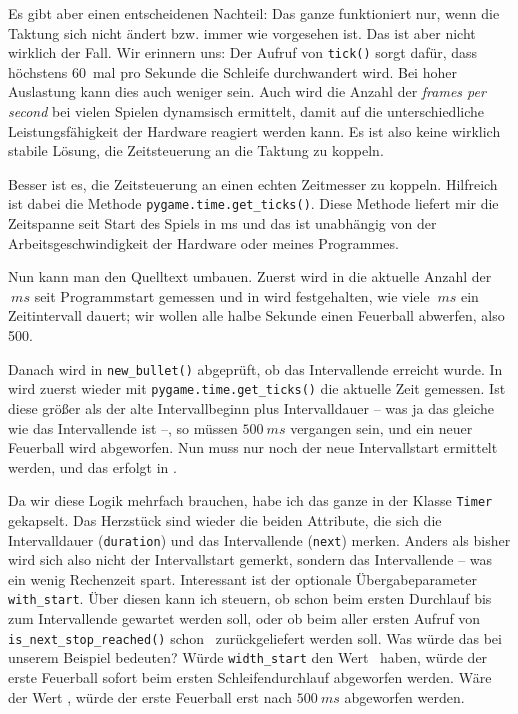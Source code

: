 Es gibt aber einen entscheidenen Nachteil: Das ganze funktioniert nur, wenn die Taktung sich nicht ändert bzw. immer wie vorgesehen ist. Das ist aber nicht wirklich der Fall. Wir erinnern uns: Der Aufruf von \texttt{tick()} sorgt dafür, dass höchstens 60~mal pro Sekunde die Schleife durchwandert wird. Bei hoher Auslastung kann dies auch weniger sein. Auch wird die Anzahl der \emph{frames per second} bei vielen Spielen dynamsisch ermittelt, damit auf die unterschiedliche Leistungsfähigkeit der Hardware reagiert werden kann. Es ist also keine wirklich stabile Lösung, die Zeitsteuerung an die Taktung zu koppeln. 

Besser ist es, die Zeitsteuerung an einen echten Zeitmesser zu koppeln. Hilfreich ist dabei die Methode \texttt{pygame.time.get\_ticks()}. Diese Methode liefert mir die Zeitspanne seit Start des Spiels in \gls{ms} und das ist unabhängig von der Arbeitsgeschwindigkeit der Hardware oder meines Programmes.

Nun kann man den Quelltext umbauen. Zuerst wird in  die aktuelle Anzahl der $~ms$ seit Programmstart gemessen und in  wird festgehalten, wie viele $~ms$ ein Zeitintervall dauert; wir wollen alle halbe Sekunde einen Feuerball abwerfen, also 500.


Danach wird in \texttt{new\_bullet()} abgeprüft, ob das Intervallende erreicht wurde. In  wird zuerst wieder mit \texttt{pygame.time.get\_ticks()} die aktuelle Zeit gemessen. Ist diese größer als der alte Intervallbeginn plus Intervalldauer -- was ja das gleiche wie das Intervallende ist --, so müssen $500~ms$ vergangen sein, und ein neuer Feuerball wird abgeworfen. Nun muss nur noch der neue Intervallstart ermittelt werden, und das erfolgt in .


Da wir diese Logik mehrfach brauchen, habe ich das ganze in der Klasse \texttt{Timer} gekapselt. Das Herzstück sind wieder die beiden Attribute, die sich die Intervalldauer (\texttt{duration}) und das Intervallende (\texttt{next})  merken. Anders als bisher wird sich also nicht der Intervallstart gemerkt, sondern das Intervallende -- was ein wenig Rechenzeit spart. Interessant ist der optionale Übergabeparameter \texttt{with\_start}. Über diesen kann ich steuern, ob schon beim ersten Durchlauf bis zum Intervallende gewartet werden soll, oder ob beim aller ersten Aufruf von \texttt{is\_next\_stop\_reached()} schon \true\ zurückgeliefert werden soll. Was würde das bei unserem Beispiel bedeuten? Würde \texttt{width\_start} den Wert \true\ haben, würde der erste Feuerball sofort beim ersten Schleifendurchlauf abgeworfen werden. Wäre der Wert \false, würde der erste Feuerball erst nach $500~ms$ abgeworfen werden.

